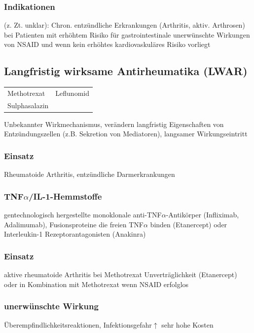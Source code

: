 \documentclass[10pt,a4paper]{report}
\begin{document}
\subsubsection{Indikationen} %
\label{par:indikationen}
 (z. Zt. unklar): Chron. entzündliche Erkrankungen (Arthritis, aktiv. Arthrosen) bei Patienten mit erhöhtem Risiko für gastrointestinale unerwünschte Wirkungen von NSAID und wenn kein erhöhtes kardiovaskuläres Risiko vorliegt
\subsection{Langfristig wirksame Antirheumatika (LWAR)} %
\label{sub:langfristig_wirksame_antirheumatika_lwar_}
\begin{tabularx}{\textwidth}{XX}
Methotrexat&Leflunomid\\
Sulphasalazin&\\
\end{tabularx}
Unbekannter Wirkmechanismus, verändern langfristig Eigenschaften von Entzündungszellen (z.B. Sekretion von Mediatoren), langsamer Wirkungseintritt
\subsubsection{Einsatz} %
\label{par:einsatz}
Rheumatoide Arthritis, entzündliche Darmerkrankungen
\subsubsection{TNF$\alpha$/IL-1-Hemmstoffe} %
\label{par:tnf_alpha_il_1_hemmstoffe}
gentechnologisch hergestellte monoklonale anti-TNF$\alpha$-Antikörper (Infliximab, Adalimumab), Fusionsproteine die freien TNF$\alpha$ binden (Etanercept) oder Interleukin-1 Rezeptorantagonisten (Anakinra)
\subsubsection{Einsatz} %
\label{par:einsatz}
aktive rheumatoide Arthritis bei Methotrexat Unverträglichkeit (Etanercept) oder in Kombination mit Methotrexat wenn NSAID erfolglos 
\subsubsection{unerwünschte Wirkung} %
\label{par:unerw_nschte_wirkung}
Überempfindlichkeitsreaktionen, Infektionsgefahr$\uparrow$
sehr hohe Kosten 
\end{document}
